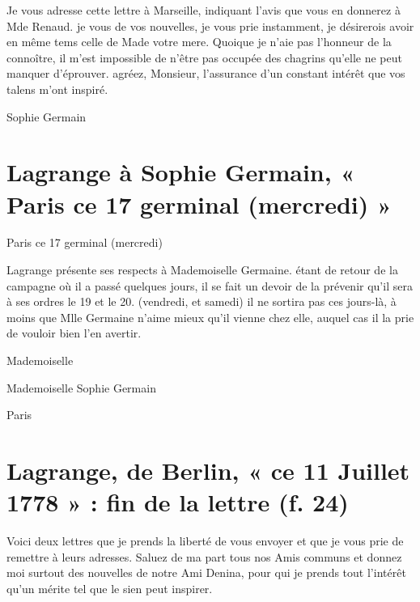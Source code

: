 \documentclass[11pt,a4paper]{article}
\begin{document}

Je vous adresse cette lettre à Marseille, indiquant l'avis que vous en
donnerez à Mde Renaud. je vous  \ill{} de vos nouvelles,
je vous prie instamment, je désirerois avoir en même tems celle de Made votre
mere. Quoique je n'aie pas l'honneur de la connoître, il m'est impossible de
n'être pas occupée des chagrins qu'elle ne peut manquer d'éprouver. agréez,
Monsieur, l'assurance d'un constant intérêt que vos talens m'ont inspiré.

Sophie Germain

\section{Lagrange à Sophie Germain, « Paris ce 17 germinal (mercredi) »}

Paris ce 17 germinal (mercredi)

Lagrange présente ses respects à Mademoiselle Germaine. étant de retour de la
campagne où il a passé quelques jours, il se fait un devoir de la prévenir
qu'il sera à ses ordres le 19 et le 20. (vendredi, et samedi) il ne sortira
pas ces jours-là, à moins que Mlle Germaine n'aime mieux qu'il vienne chez
elle, auquel cas il la prie de vouloir bien l'en avertir.


Mademoiselle

Mademoiselle Sophie Germain

Paris

\section{Lagrange, de Berlin, « ce 11 Juillet 1778 » : fin de la lettre (f. 24)}

Voici deux lettres que je prends la liberté de vous envoyer et que je vous
prie de remettre à leurs adresses. Saluez de ma part tous nos Amis communs et
donnez moi surtout des nouvelles de notre Ami Denina, pour qui je prends tout
l'intérêt qu'un mérite tel que le sien peut inspirer.
\end{document}
